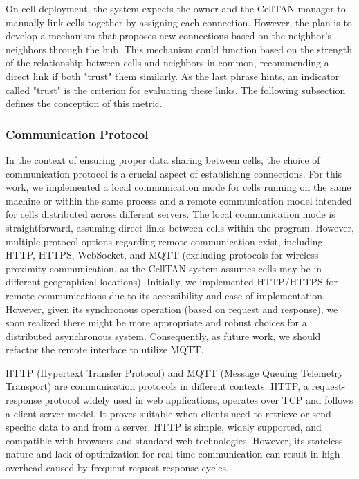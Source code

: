 On cell deployment, the system expects the owner and the CellTAN manager to manually link cells together by assigning each connection. However, the plan is to develop a mechanism that proposes new connections based on the neighbor's neighbors through the hub. This mechanism could function based on the strength of the relationship between cells and neighbors in common, recommending a direct link if both "trust" them similarly. As the last phrase hints, an indicator called "trust" is the criterion for evaluating these links. The following subsection defines the conception of this metric.

\subsubsection{Communication Protocol}

In the context of ensuring proper data sharing between cells, the choice of communication protocol is a crucial aspect of establishing connections. For this work, we implemented a local communication mode for cells running on the same machine or within the same process and a remote communication model intended for cells distributed across different servers. The local communication mode is straightforward, assuming direct links between cells within the program. However, multiple protocol options regarding remote communication exist, including HTTP, HTTPS, WebSocket, and MQTT (excluding protocols for wireless proximity communication, as the CellTAN system assumes cells may be in different geographical locations). Initially, we implemented HTTP/HTTPS for remote communications due to its accessibility and ease of implementation. However, given its synchronous operation (based on request and response), we soon realized there might be more appropriate and robust choices for a distributed asynchronous system. Consequently, as future work, we should refactor the remote interface to utilize MQTT.

HTTP (Hypertext Transfer Protocol) and MQTT (Message Queuing Telemetry Transport) are communication protocols in different contexts. HTTP, a request-response protocol widely used in web applications, operates over TCP and follows a client-server model. It proves suitable when clients need to retrieve or send specific data to and from a server. HTTP is simple, widely supported, and compatible with browsers and standard web technologies. However, its stateless nature and lack of optimization for real-time communication can result in high overhead caused by frequent request-response cycles.

